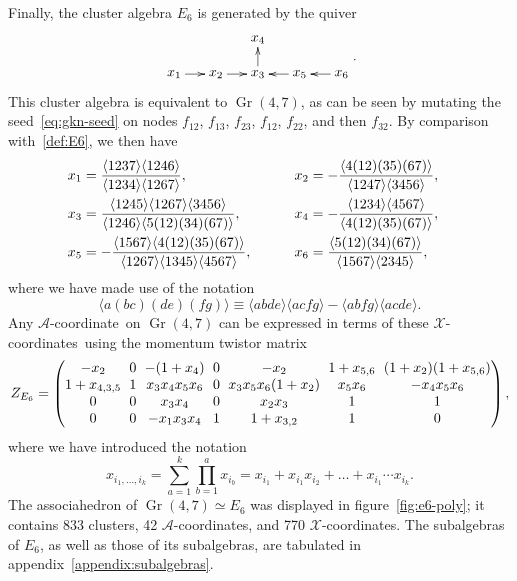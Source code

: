 \documentclass[11pt]{article}
\DeclareMathOperator{\Gr}{Gr}
\def\ket#1{\langle #1 \rangle}
\def\xcoords{$\mathcal{X}$-coordinates}
\def\acoord{$\mathcal{A}$-coordinate}
\def\acoords{$\mathcal{A}$-coordinates}
\begin{document}
Finally, the cluster algebra $E_6$ is generated by the quiver
\begin{equation}\label{def:E6}
    \begin{gathered}
    \begin{xy} 0;<1pt,0pt>:<0pt,-1pt>::
      (0,0) *+{x_1} ="1",
      (30,0) *+{x_2} ="2",
      (60,0) *+{x_3} ="3",
      (60,-25) *+{x_4} ="4",
      (90,0) *+{x_5} ="5",
      (120,0) *+{x_6} ="6",
      "1", {\ar"2"},
      "2", {\ar"3"},
      "3", {\ar"4"},
      "5", {\ar"3"},
      "6", {\ar"5"},
    \end{xy}
    \end{gathered} .
\end{equation}
This cluster algebra is equivalent to $\Gr(4,7)$, as can be seen by mutating the seed~\eqref{eq:gkn-seed} on nodes $f_{12}$, $f_{13}$, $f_{23}$, $f_{12}$, $f_{22}$, and then $f_{32}$. By comparison with~\eqref{def:E6}, we then have 
\begin{align} \label{eq:E6_x_def}
x_1 &= \frac{\ket{1237} \ket{1246}}{\ket{1234}\ket{1267}}, \hspace{13.03ex} \quad \quad x_2 = - \frac{\ket{4(12)(35)(67)}}{\ket{1247} \ket{3456}}, \quad \nonumber \\
x_3 &= \frac{\ket{1245} \ket{1267} \ket{3456}}{\ket{1246} \ket{5(12)(34)(67)}}, \hspace{4.12ex} \quad \quad x_4 = -\frac{\ket{1234} \ket{4567}}{\ket{4(12)(35)(67)}}, \quad \\
 x_5 &= -\frac{\ket{1567}\ket{4(12)(35)(67)}}{\ket{1267} \ket{1345}\ket{4567}}, \quad \quad \quad x_6 = \frac{\ket{5(12)(34)(67)}}{\ket{1567}\ket{2345}}, \quad \nonumber
\end{align}
where we have made use of the notation
\begin{equation}
\ket{a(bc)(de)(fg)} \equiv \ket{abde}\ket{acfg}-\ket{abfg}\ket{acde}.
\end{equation}
Any \acoord\ on $\Gr(4,7)$ can be expressed in terms of these \xcoords\ using the momentum twistor matrix 
\begin{equation}
Z_{E_6} = 
\begingroup
\setlength\arraycolsep{3pt}
\begin{pmatrix} 
 -x_2 & 0 & -(1+x_4) & 0 & -x_2 & 1+x_{5,6} & (1+x_2) (1+x_{5,6}) \\
 1+x_{4,3,5} & 1 & x_3 x_4 x_5 x_6 & 0 & x_3 x_5 x_6 (1+x_2) & x_5 x_6 & -x_4 x_5 x_6 \\
 0 & 0 & x_3 x_4 & 0 & x_2 x_3 & 1 & 1 \\
 0 & 0 & -x_1 x_3 x_4 & 1 & 1+x_{3,2} & 1 & 0 \\
\end{pmatrix} ,
\endgroup
\end{equation}
where we have introduced the notation
\begin{equation} \label{eq:compound_x_def}
	x_{i_1,\ldots, i_k} = \sum_{a=1}^k \prod_{b=1}^a x_{i_b} = x_{i_1}+x_{i_1}x_{i_2} + \ldots + x_{i_1}\cdots x_{i_k}.
\end{equation}
The associahedron of $\Gr(4,7) \simeq E_6$ was displayed in figure~\ref{fig:e6-poly}; it contains 833 clusters, 42 \acoords, and 770 \xcoords. The subalgebras of $E_6$, as well as those of its subalgebras, are tabulated in appendix~\ref{appendix:subalgebras}.
\end{document}
